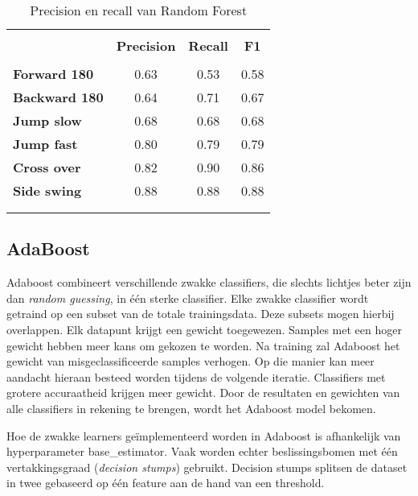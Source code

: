 \begin{table}[!htpd]
  \centering
  \caption{Precision en recall van Random Forest}
  \label{tab:randomForest}
\begin{tabular}{lccc}
 \hline \\
\textbf{}             & \textbf{Precision} & \textbf{Recall} & \textbf{F1} &  \\
 \hline \\
\textbf{Forward 180}  & 0.63               & 0.53            & 0.58        &  \\
\textbf{Backward 180} & 0.64               & 0.71            & 0.67        &  \\
\textbf{Jump slow}    & 0.68               & 0.68            & 0.68        &  \\
\textbf{Jump fast}    & 0.80               & 0.79            & 0.79        &  \\
\textbf{Cross over}   & 0.82               & 0.90            & 0.86        &  \\
\textbf{Side swing}   & 0.88               & 0.88            & 0.88        & \\ \\
 \hline \\
\end{tabular}
\end{table}

\subsection{AdaBoost}
Adaboost combineert verschillende zwakke classifiers, die slechts lichtjes beter zijn dan \textit{random guessing}, in één sterke classifier. Elke zwakke classifier wordt getraind op een subset van de totale trainingsdata. Deze subsets mogen hierbij overlappen. Elk datapunt krijgt een gewicht toegewezen. Samples met een hoger gewicht hebben meer kans om gekozen te worden. Na training zal Adaboost het gewicht van misgeclassificeerde samples verhogen. Op die manier kan meer aandacht hieraan besteed worden tijdens de volgende iteratie. Classifiers met grotere accuraatheid krijgen meer gewicht. Door de resultaten en gewichten van alle classifiers in rekening te brengen, wordt het Adaboost model bekomen. 

Hoe de zwakke learners geïmplementeerd worden in Adaboost is afhankelijk van hyperparameter base\_estimator. Vaak worden echter beslissingsbomen met één vertakkingsgraad (\textit{decision stumps}) gebruikt. Decision stumps splitsen de dataset in twee gebaseerd op één feature aan de hand van een threshold.

